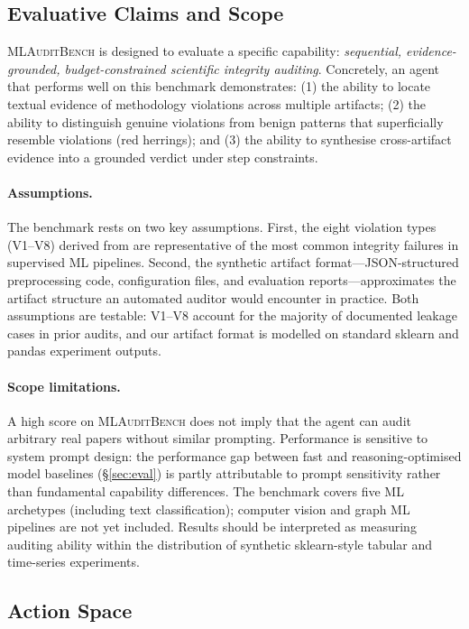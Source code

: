 \documentclass{article}
\begin{document}
\subsection{Evaluative Claims and Scope}
\label{sec:claims}

\textsc{MLAuditBench} is designed to evaluate a specific capability:
\emph{sequential, evidence-grounded, budget-constrained scientific integrity auditing}.
Concretely, an agent that performs well on this benchmark demonstrates:
(1) the ability to locate textual evidence of methodology violations across multiple artifacts;
(2) the ability to distinguish genuine violations from benign patterns that superficially resemble violations (red herrings);
and (3) the ability to synthesise cross-artifact evidence into a grounded verdict under step constraints.

\paragraph{Assumptions.}
The benchmark rests on two key assumptions.
First, the eight violation types (V1--V8) derived from \citet{kapoor2023leakage} are representative of the most common integrity failures in supervised ML pipelines.
Second, the synthetic artifact format---JSON-structured preprocessing code, configuration files, and evaluation reports---approximates the artifact structure an automated auditor would encounter in practice.
Both assumptions are testable: V1--V8 account for the majority of documented leakage cases in prior audits, and our artifact format is modelled on standard sklearn and pandas experiment outputs.

\paragraph{Scope limitations.}
A high score on \textsc{MLAuditBench} does not imply that the agent can audit arbitrary real papers without similar prompting.
Performance is sensitive to system prompt design: the performance gap between fast and reasoning-optimised model baselines (\S\ref{sec:eval}) is partly attributable to prompt sensitivity rather than fundamental capability differences.
The benchmark covers five ML archetypes (including text classification); computer vision and graph ML pipelines are not yet included.
Results should be interpreted as measuring auditing ability within the distribution of synthetic sklearn-style tabular and time-series experiments.

\subsection{Action Space}
\end{document}
